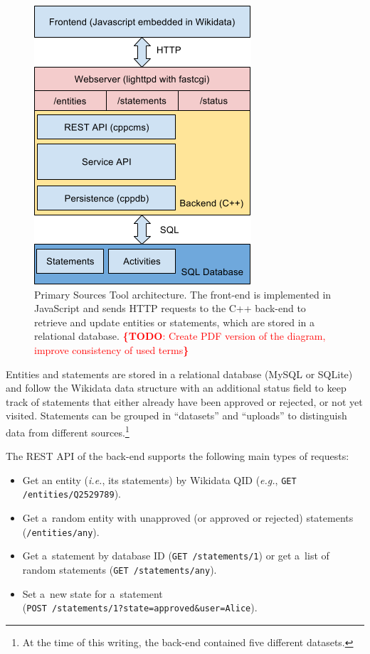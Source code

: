 \documentclass{acm_proc_article-sp}
\newcommand{\todo}[1]{\noindent\textcolor{red}{{\bf \{TODO}: #1{\bf \}}}}
\begin{document}
\begin{figure}[!htbp]
    \centering
    \includegraphics[width=.7\columnwidth]{img/architecture.png}
    \caption{Primary Sources Tool architecture. The front-end is implemented in
      JavaScript and sends HTTP requests to the C++ back-end to retrieve and
      update entities or statements, which are stored in a relational database.
      \todo{Create PDF version of the diagram, improve consistency of used terms}}
    \label{fig:architecture}
\end{figure}

Entities and statements are stored in a relational database (MySQL or SQLite)
and follow the Wikidata data structure with an additional status field
to keep track of statements that either already have been approved or rejected,
or not yet visited.
Statements can be grouped in ``datasets'' and ``uploads'' to
distinguish data from different sources.\footnote{At the time of this writing,
the back-end contained five different datasets.}

The REST API of the back-end supports the following main types of requests:

\begin{itemize}
  \setlength\itemsep{0em}
  \item Get an entity (\emph{i.e.}, its statements) by Wikidata QID
  (\emph{e.g.}, \verb|GET /entities/Q2529789|).
  \item Get a~random entity with unapproved (or approved or rejected) statements
  (\verb|/entities/any|).
  \item Get a~statement by database ID (\verb|GET /statements/1|) or get a~list of
  random statements (\verb|GET /statements/any|).
  \item Set a~new state for a~statement \\(\verb|POST /statements/1?state=approved&user=Alice|).
\end{itemize}
\end{document}
